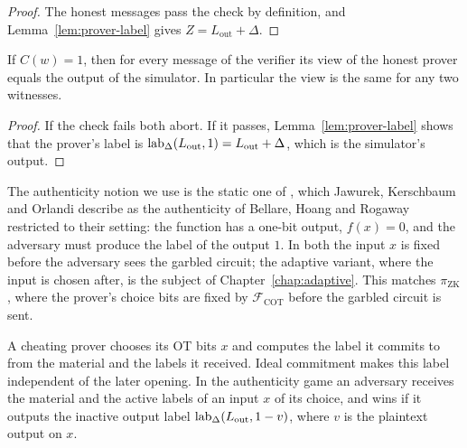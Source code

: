 \begin{proof}
  \leanok
  The honest messages pass the check by definition, and Lemma~\ref{lem:prover-label} gives
  $Z = L_{\mathrm{out}} + \Delta$.
\end{proof}

\begin{theorem}
  \label{thm:zk}
  \leanok
  If $C(w) = 1$, then for every message of the verifier its view of the honest prover equals the
  output of the simulator. In particular the view is the same for any two witnesses.
\end{theorem}

\begin{proof}
  \leanok
  If the check fails both abort. If it passes, Lemma~\ref{lem:prover-label} shows that the
  prover's label is $\operatorname{lab}_\Delta(L_{\mathrm{out}}, 1) = L_{\mathrm{out}} + \Delta$, which is the
  simulator's output.
\end{proof}

\begin{remark}
  The authenticity notion we use is the static one of \cite[Definition~2]{JKO13}, which Jawurek,
  Kerschbaum and Orlandi describe as the authenticity of Bellare, Hoang and Rogaway
  \cite[Sect.~3.6, game Aut of Fig.~5]{BHR12b} restricted to their setting: the function has a
  one-bit output, $f(x) = 0$, and the adversary must produce the label of the output $1$. In both
  the input $x$ is fixed before the adversary sees the garbled circuit; the adaptive variant, where
  the input is chosen after, is the subject of Chapter~\ref{chap:adaptive}. This matches
  $\pi_{\mathrm{ZK}}$, where the prover's choice bits are fixed by $\mathcal{F}_{\mathrm{COT}}$
  before the garbled circuit is sent.
\end{remark}

\begin{definition}
  \label{def:auth-game}
  \leanok
  A cheating prover chooses its OT bits $x$ and computes the label it commits to from the
  material and the labels it received. Ideal commitment makes this label independent of the later
  opening. In the authenticity game an adversary receives the material and the active labels of an
  input $x$ of its choice, and wins if it outputs the inactive output label
  $\operatorname{lab}_\Delta(L_{\mathrm{out}}, 1 - v)$, where $v$ is the plaintext output on $x$.
\end{definition}

